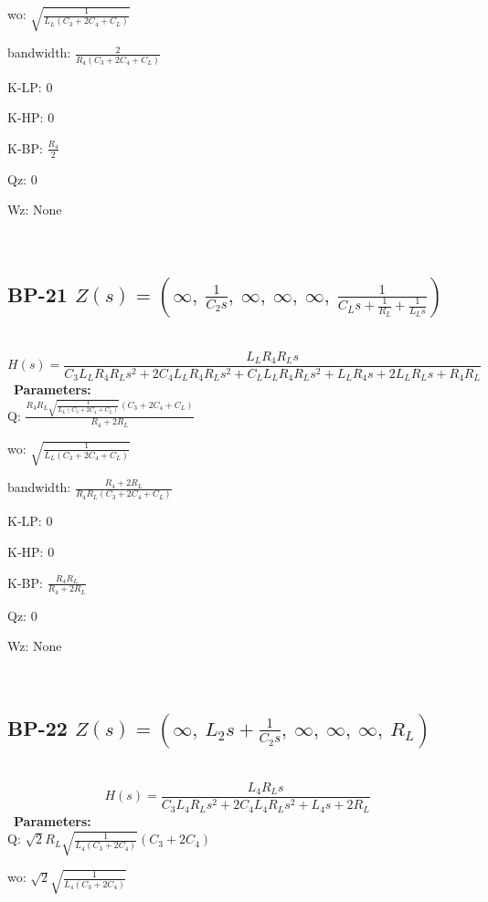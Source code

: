 \documentclass{article}
\begin{document}
wo: $\sqrt{\frac{1}{L_{L} \left(C_{3} + 2 C_{4} + C_{L}\right)}}$\ 

bandwidth: $\frac{2}{R_{4} \left(C_{3} + 2 C_{4} + C_{L}\right)}$\ 

K-LP: $0$\ 

K-HP: $0$\ 

K-BP: $\frac{R_{4}}{2}$\ 

Qz: $0$\ 

Wz: $\text{None}$\ 

\ 

\subsection{BP-21 $Z(s) = \left( \infty, \  \frac{1}{C_{2} s}, \  \infty, \  \infty, \  \infty, \  \frac{1}{C_{L} s + \frac{1}{R_{L}} + \frac{1}{L_{L} s}}\right)$ } \ 
\textbf{\[H(s) = \frac{L_{L} R_{4} R_{L} s}{C_{3} L_{L} R_{4} R_{L} s^{2} + 2 C_{4} L_{L} R_{4} R_{L} s^{2} + C_{L} L_{L} R_{4} R_{L} s^{2} + L_{L} R_{4} s + 2 L_{L} R_{L} s + R_{4} R_{L}}\] } \ 
\textbf{Parameters:}\\ 

Q: $\frac{R_{4} R_{L} \sqrt{\frac{1}{L_{L} \left(C_{3} + 2 C_{4} + C_{L}\right)}} \left(C_{3} + 2 C_{4} + C_{L}\right)}{R_{4} + 2 R_{L}}$\ 

wo: $\sqrt{\frac{1}{L_{L} \left(C_{3} + 2 C_{4} + C_{L}\right)}}$\ 

bandwidth: $\frac{R_{4} + 2 R_{L}}{R_{4} R_{L} \left(C_{3} + 2 C_{4} + C_{L}\right)}$\ 

K-LP: $0$\ 

K-HP: $0$\ 

K-BP: $\frac{R_{4} R_{L}}{R_{4} + 2 R_{L}}$\ 

Qz: $0$\ 

Wz: $\text{None}$\ 

\ 

\subsection{BP-22 $Z(s) = \left( \infty, \  L_{2} s + \frac{1}{C_{2} s}, \  \infty, \  \infty, \  \infty, \  R_{L}\right)$ } \ 
\textbf{\[H(s) = \frac{L_{4} R_{L} s}{C_{3} L_{4} R_{L} s^{2} + 2 C_{4} L_{4} R_{L} s^{2} + L_{4} s + 2 R_{L}}\] } \ 
\textbf{Parameters:}\\ 

Q: $\sqrt{2} R_{L} \sqrt{\frac{1}{L_{4} \left(C_{3} + 2 C_{4}\right)}} \left(C_{3} + 2 C_{4}\right)$\ 

wo: $\sqrt{2} \sqrt{\frac{1}{L_{4} \left(C_{3} + 2 C_{4}\right)}}$\ 
\end{document}
